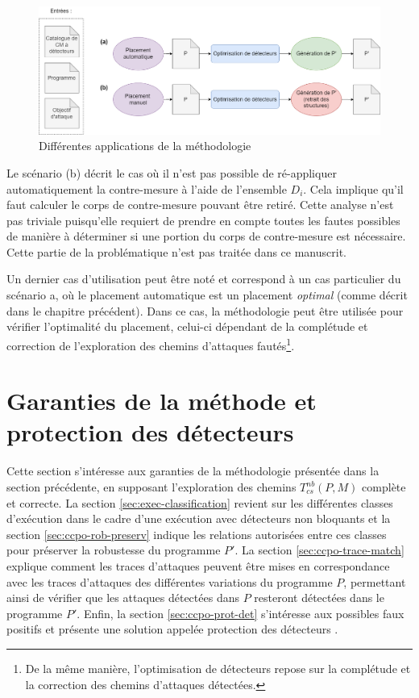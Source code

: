             \begin{figure}[!ht]
            \centering
                \includegraphics[scale=0.33]{ch6-ccpo/img/placement-ccpo2.drawio.png}
                \caption{Différentes applications de la méthodologie}
                \label{fig:ccpo-metho}
            \end{figure}
    
            Le scénario (b) décrit le cas où il n'est pas possible de ré-appliquer automatiquement la contre-mesure à l'aide de l'ensemble $D_i$. Cela implique qu'il faut calculer le corps de contre-mesure pouvant être retiré.
            Cette analyse n'est pas triviale puisqu'elle requiert de prendre en compte toutes les fautes possibles de manière à déterminer si une portion du corps de contre-mesure est nécessaire.
            Cette partie de la problématique n'est pas traitée dans ce manuscrit.
    
            Un dernier cas d'utilisation peut être noté et correspond à un cas particulier du scénario a, où le placement automatique est un placement \textit{optimal} (comme décrit dans le chapitre précédent). Dans ce cas, la méthodologie peut être utilisée pour vérifier l'optimalité du placement, celui-ci dépendant de la complétude et correction de l'exploration des chemins d'attaques fautés\footnote{De la même manière, l'optimisation de détecteurs repose sur la complétude et la correction des chemins d'attaques détectées.}.
      
    \section{Garanties de la méthode et protection des détecteurs}
    \label{sec:ccpo-formalisation}

        Cette section s'intéresse aux garanties de la méthodologie présentée dans la section précédente, en supposant l'exploration des chemins $T^{nb}_{cs}(P, M)$ complète et correcte.
        La section \ref{sec:exec-classification} revient sur les différentes classes d'exécution dans le cadre d'une exécution avec détecteurs non bloquants et la section \ref{sec:ccpo-rob-preserv} indique les relations autorisées entre ces classes pour préserver la robustesse du programme $P'$.
        La section \ref{sec:ccpo-trace-match} explique comment les traces d'attaques peuvent être mises en correspondance avec les traces d'attaques des différentes variations du programme $P$, permettant ainsi de vérifier que les attaques détectées dans $P$ resteront détectées dans le programme $P'$.
        Enfin, la section \ref{sec:ccpo-prot-det} s'intéresse aux possibles faux positifs et présente une solution appelée \og protection des détecteurs \fg{}. 
        
